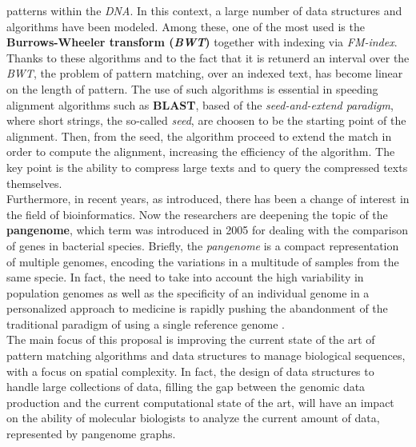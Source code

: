 \documentclass[a4paper,11pt, oneside]{article}
\newcommand{\pb}[1]{\todo{\textbf{PB} #1}}
\begin{document}
patterns within the \textit{DNA}. 
In this context, a large number of data structures and algorithms have been
modeled. Among these, one of the most used is the \textbf{Burrows-Wheeler
  transform (\textit{BWT})} together with indexing via \textit{FM-index}. Thanks
to these algorithms and to the fact that it is retunerd an interval over the
\textit{BWT}, the problem of pattern matching, over an indexed text, has become 
linear on the length of pattern. The
use of such 
algorithms is essential in speeding alignment algorithms such as
\textbf{BLAST}, based of the \textit{seed-and-extend paradigm}, where short
strings, the so-called \textit{seed}, are choosen to be the starting point of
the alignment. Then, from the seed, the algorithm proceed to extend the match in
order to compute the alignment, increasing the efficiency of the algorithm. The
key point is the ability to compress large texts and to query the compressed
texts themselves.\\  
Furthermore, in recent years, as introduced, there has been a change of interest
in the field of bioinformatics. Now the 
researchers are deepening the topic of the \textbf{pangenome}, which
term was introduced
in 2005 for dealing with the comparison of genes in
bacterial species. Briefly, the \textit{pangenome} is a compact 
representation of multiple genomes, encoding the variations in a multitude of
samples from the same specie. In fact, the need to take into 
account the high variability in population genomes as well as the specificity of
an individual genome in a personalized approach to medicine is rapidly pushing
the abandonment of the traditional paradigm of using a single reference genome
\cite{pancon}. \\
The main focus of this proposal is improving the current state of the art
of pattern matching algorithms and data structures to manage biological
sequences, with a focus on spatial 
complexity. In fact, the design of data structures to handle large
collections of data, filling the gap between the genomic data production and the
current computational state of the art, will have an impact on the ability of
molecular biologists to analyze the current amount of data, represented by
pangenome graphs. 
\end{document}
